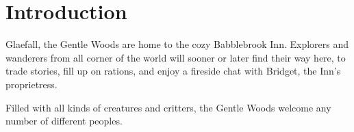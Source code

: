 \chapter{Introduction}

\begin{multicols*}{2}
     Glaefall, the Gentle Woods are home to the cozy Babblebrook Inn.
    Explorers and wanderers from all corner of the world will sooner or later find their way here, to trade stories, fill up on rations, and enjoy a fireside chat with Bridget, the Inn's proprietress.
    
    Filled with all kinds of creatures and critters, the Gentle Woods welcome any number of different peoples.
\end{multicols*}

